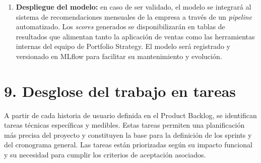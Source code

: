 \documentclass[
11pt, %
]{charter}
\begin{document}
\begin{enumerate}
\item \textbf{Despliegue del modelo:}
en caso de ser validado, el modelo se integrará al sistema de recomendaciones mensuales de la empresa a través de un \textit{pipeline} automatizado. Los \textit{scores} generados se disponibilizarán en tablas de resultados que alimentan tanto la aplicación de ventas como las herramientas internas del equipo de Portfolio Strategy. El modelo será registrado y versionado en MLflow para facilitar su mantenimiento y evolución.
\end{enumerate}

\section{9. Desglose del trabajo en tareas}
\label{sec:wbs}

A partir de cada historia de usuario definida en el Product Backlog, se identifican tareas técnicas específicas y medibles. Estas tareas permiten una planificación más precisa del proyecto y constituyen la base para la definición de los sprints y del cronograma general. Las tareas están priorizadas según su impacto funcional y su necesidad para cumplir los criterios de aceptación asociados.
\end{document}
